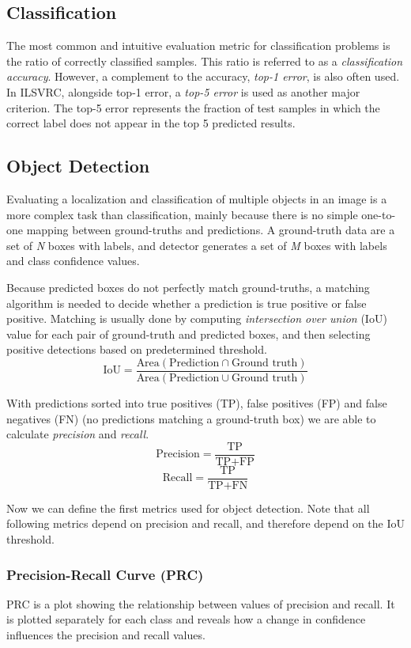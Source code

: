 \subsection{Classification}
The most common and intuitive evaluation metric for classification problems is the ratio of correctly classified samples. This ratio is referred to as a \textit{classification accuracy}. However, a complement to the accuracy, \textit{top-1 error}, is also often used. In ILSVRC,  alongside top-1 error, a \textit{top-5 error} is used as another major criterion. The top-5 error represents the fraction of test samples in which the correct label does not appear in the top 5 predicted results.

\subsection{Object Detection}
Evaluating a localization and classification of multiple objects in an image is a more complex task than classification, mainly because there is no simple one-to-one mapping between ground-truths and predictions. A ground-truth data are a set of \textit{N} boxes with labels, and detector generates a set of \textit{M} boxes with labels and class confidence values.

Because predicted boxes do not perfectly match ground-truths, a matching algorithm is needed to decide whether a prediction is true positive or false positive. Matching is usually done by computing \textit{intersection over union} (IoU) value for each pair of ground-truth and predicted boxes, and then selecting positive detections based on predetermined threshold.
$$\text{IoU} = \frac{\text{Area}(\text{Prediction} \cap \text{Ground truth})}{\text{Area}(\text{Prediction} \cup \text{Ground truth})}$$

With predictions sorted into true positives (TP), false positives (FP) and false negatives (FN) (no predictions matching a ground-truth box) we are able to calculate \textit{precision} and \textit{recall}.
$$\text{Precision} = \frac{\text{TP}}{\text{TP}+\text{FP}}$$
$$\text{Recall} = \frac{\text{TP}}{\text{TP}+\text{FN}}$$

Now we can define the first metrics used for object detection. Note that all following metrics depend on precision and recall, and therefore depend on the IoU threshold.

\subsubsection{Precision-Recall Curve (PRC)}
PRC is a plot showing the relationship between values of precision and recall. It is plotted separately for each class and reveals how a change in confidence influences the precision and recall values. 

